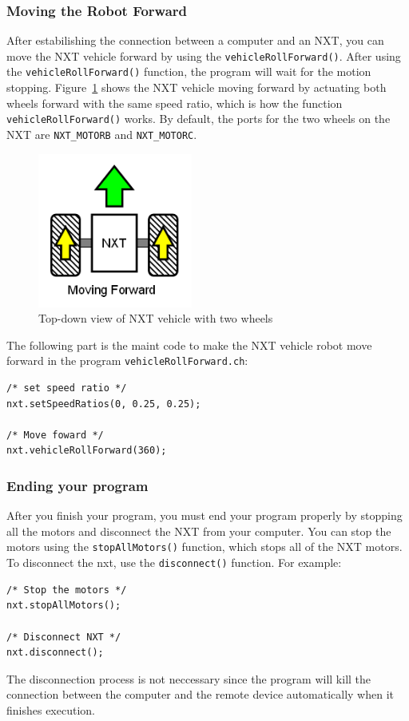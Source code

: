 \documentclass[11pt]{article}
\begin{document}
\subsubsection{Moving the Robot Forward}
After estabilishing the connection between a computer and an NXT, you can move 
the NXT vehicle forward by using the {\tt vehicleRollForward()}. After using the 
{\tt vehicleRollForward()} function, the program will wait for the motion stopping. 
Figure~\ref{fig_NXT_forward} shows the NXT vehicle moving forward by actuating 
both wheels forward with the same speed ratio, which is how the function 
{\tt vehicleRollForward()} works. By default, the ports for the two wheels on the 
NXT are {\tt NXT\_MOTORB} and {\tt NXT\_MOTORC}.
\begin{figure}[H]
  \begin{center}
    \includegraphics[height=2in]{figure/mindstorm/Vehicle_forward.png}
    \caption{Top-down view of NXT vehicle with two wheels\label{fig_NXT_forward}}
  \end{center}
\end{figure}
The following part is the maint code to make the NXT vehicle robot move forward 
in the program {\tt vehicleRollForward.ch}:
\begin{lstlisting}
/* set speed ratio */
nxt.setSpeedRatios(0, 0.25, 0.25);

/* Move foward */
nxt.vehicleRollForward(360);
\end{lstlisting}

\subsubsection{Ending your program}
After you finish your program, you must end your program properly by stopping 
all the motors and disconnect the NXT from your computer. You can stop the 
motors using the {\tt stopAllMotors()} function, which stops all of the NXT 
motors. To disconnect the nxt, use the {\tt disconnect()} function. For example:
\begin{lstlisting}
/* Stop the motors */
nxt.stopAllMotors();
    
/* Disconnect NXT */
nxt.disconnect();
\end{lstlisting}
The disconnection process is not neccessary since the program will kill the 
connection between the computer and the remote device automatically when it 
finishes execution.
\end{document}
